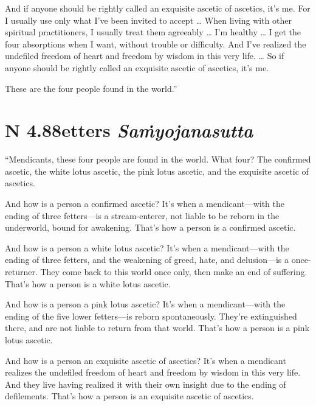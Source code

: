 \documentclass[12pt,openany]{book}%
\newcommand*{\suttatitleacronym}[1]{\smaller[2]{#1}\vspace*{.3em}}
\newcommand*{\suttatitletranslation}[1]{\linebreak{#1}}
\newcommand*{\suttatitleroot}[1]{\linebreak\smaller[2]\itshape{#1}}
\newcommand*{\tocacronym}[1]{\hspace*{-3.3em}{#1}\quad}
\newcommand*{\toctranslation}[1]{#1}
\newcommand*{\tocroot}[1]{(\textit{#1})}
\begin{document}
And if anyone should be rightly called an exquisite ascetic of ascetics, it’s me. For I usually use only what I’ve been invited to accept … When living with other spiritual practitioners, I usually treat them agreeably … I’m healthy … I get the four absorptions when I want, without trouble or difficulty. And I’ve realized the undefiled freedom of heart and freedom by wisdom in this very life. … So if anyone should be rightly called an exquisite ascetic of ascetics, it’s me. 

These are the four people found in the world.” 

%
\section*{{\suttatitleacronym AN 4.88}{\suttatitletranslation Fetters }{\suttatitleroot Saṁyojanasutta}}
\addcontentsline{toc}{section}{\tocacronym{AN 4.88} \toctranslation{Fetters } \tocroot{Saṁyojanasutta}}

“Mendicants, these four people are found in the world. What four? The confirmed ascetic, the white lotus ascetic, the pink lotus ascetic, and the exquisite ascetic of ascetics. 

And how is a person a confirmed ascetic? It’s when a mendicant—with the ending of three fetters—is a stream-enterer, not liable to be reborn in the underworld, bound for awakening. That’s how a person is a confirmed ascetic. 

And how is a person a white lotus ascetic? It’s when a mendicant—with the ending of three fetters, and the weakening of greed, hate, and delusion—is a once-returner. They come back to this world once only, then make an end of suffering. That’s how a person is a white lotus ascetic. 

And how is a person a pink lotus ascetic? It’s when a mendicant—with the ending of the five lower fetters—is reborn spontaneously. They’re extinguished there, and are not liable to return from that world. That’s how a person is a pink lotus ascetic. 

And how is a person an exquisite ascetic of ascetics? It’s when a mendicant realizes the undefiled freedom of heart and freedom by wisdom in this very life. And they live having realized it with their own insight due to the ending of defilements. That’s how a person is an exquisite ascetic of ascetics. 
\end{document}
